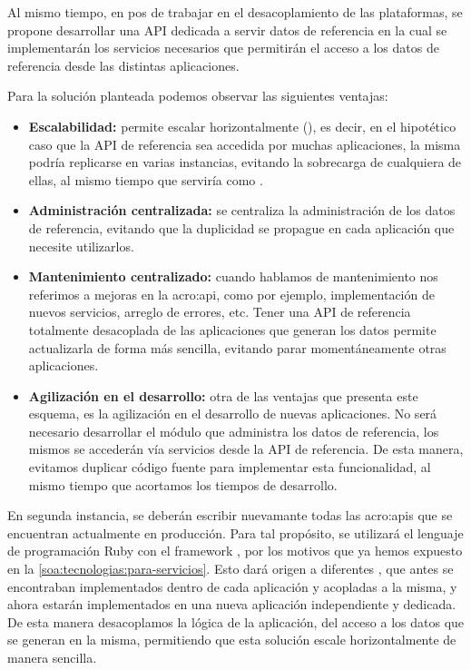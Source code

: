 Al mismo tiempo, en pos de trabajar en el desacoplamiento de las plataformas, se propone desarrollar una API dedicada a servir datos de referencia en la cual se implementarán los servicios necesarios que permitirán el acceso a los datos de referencia desde las distintas aplicaciones.

Para la solución planteada podemos observar las siguientes ventajas:

\begin{itemize}
  \item \textbf{Escalabilidad:} permite escalar horizontalmente (), es decir, en el hipotético caso que la API de referencia sea accedida por muchas aplicaciones, la misma podría replicarse en varias instancias, evitando la sobrecarga de cualquiera de ellas, al mismo tiempo que serviría como .

  \item \textbf{Administración centralizada:} se centraliza la administración de los datos de referencia, evitando que la duplicidad se propague en cada aplicación que necesite utilizarlos.

  \item \textbf{Mantenimiento centralizado:} cuando hablamos de mantenimiento nos referimos a mejoras en la \gls{acro:api}, como por ejemplo, implementación de nuevos servicios, arreglo de errores, etc. Tener una API de referencia totalmente desacoplada de las aplicaciones que generan los datos permite actualizarla de forma más sencilla, evitando parar momentáneamente otras aplicaciones.

  \item \textbf{Agilización en el desarrollo:} otra de las ventajas que presenta este esquema, es la agilización en el desarrollo de nuevas aplicaciones. No será necesario desarrollar el módulo que administra los datos de referencia, los mismos se accederán vía servicios desde la API de referencia.  De esta manera, evitamos duplicar código fuente para implementar esta funcionalidad, al mismo tiempo que acortamos los tiempos de desarrollo.
\end{itemize}

En segunda instancia, se deberán escribir nuevamante todas las \glspl{acro:api} que se encuentran actualmente en producción. Para tal propósito, se utilizará el lenguaje de programación Ruby con el framework , por los motivos que ya hemos expuesto en la \autoref{soa:tecnologias:para-servicios}. Esto dará origen a diferentes , que antes se encontraban implementados dentro de cada aplicación y acopladas a la misma, y ahora estarán implementados en una nueva aplicación independiente y dedicada.  De esta manera desacoplamos la lógica de la aplicación, del acceso a los datos que se generan en la misma, permitiendo que esta solución escale horizontalmente de manera sencilla.

